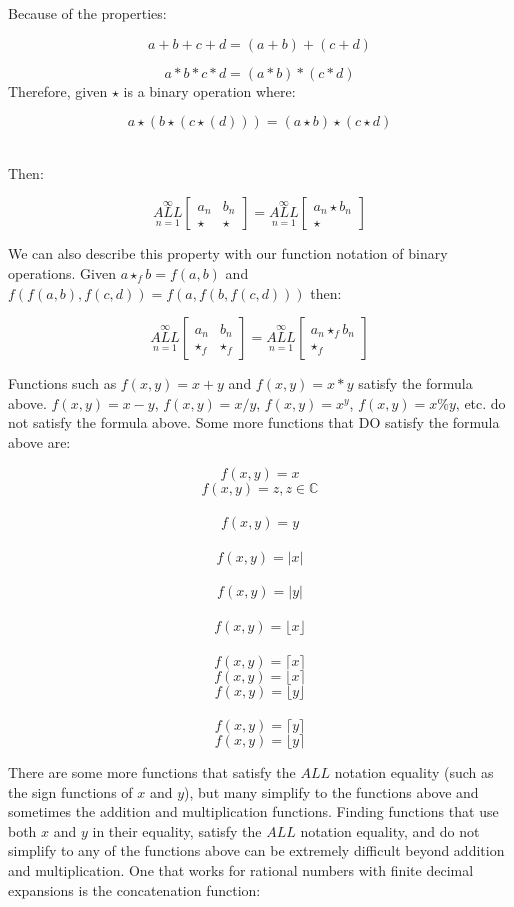 \documentclass{article}
\begin{document}
Because of the properties:

$$a+b+c+d=(a+b)+(c+d)$$

$$a*b*c*d=(a*b)*(c*d)$$
Therefore, given $\star$ is a binary operation where:

$$a\star(b\star(c\star(d)))=(a \star b) \star (c \star d)$$ 

Then:

$$\underset{n=1}{\overset{\infty}{ALL}} \begin{bmatrix}
a_n & b_n \\
\star & \star
\end{bmatrix} = \underset{n=1}{\overset{\infty}{ALL}} \begin{bmatrix}
a_n \star b_n \\
 \star
\end{bmatrix}$$

We can also describe this property with our function notation of binary operations. Given $a\star_fb=f(a,b)$ and $f(f(a,b),f(c,d))=f(a,f(b,f(c,d)))$ then:

$$\underset{n=1}{\overset{\infty}{ALL}} \begin{bmatrix}
a_n & b_n \\
\star_f & \star_f
\end{bmatrix} = \underset{n=1}{\overset{\infty}{ALL}} \begin{bmatrix}
a_n \star_f b_n \\
 \star_f
\end{bmatrix}$$

Functions such as $f(x,y)=x+y$ and $f(x,y)=x*y$ satisfy the formula above. $f(x,y)=x-y$, $f(x,y)=x/y$, $f(x,y)=x^y$, $f(x,y)=x\%y$, etc. do not satisfy the formula above. Some more functions that DO satisfy the formula above are:

$$f(x,y)=x$$
$$f(x,y)=z, z\in\mathbb{C}$$ 
$$f(x,y)=y$$ 
$$f(x,y)=|x|$$ 
$$f(x,y)=|y|$$ 
$$f(x,y)=\lfloor x \rfloor$$ 
$$f(x,y)=\lceil x \rceil$$
$$f(x,y)=\lfloor x \rceil$$
$$f(x,y)=\lfloor y \rfloor$$ 
$$f(x,y)=\lceil y \rceil$$
$$f(x,y)=\lfloor y \rceil$$

There are some more functions that satisfy the $ALL$ notation equality (such as the sign functions of $x$ and $y$), but many simplify to the functions above and sometimes the addition and multiplication functions. Finding functions that use both $x$ and $y$ in their equality, satisfy the $ALL$ notation equality, and do not simplify to any of the functions above can be extremely difficult beyond addition and multiplication. One that works for rational numbers with finite decimal expansions is the concatenation function:
\end{document}
